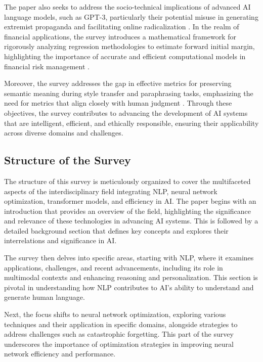 The paper also seeks to address the socio-technical implications of advanced AI language models, such as GPT-3, particularly their potential misuse in generating extremist propaganda and facilitating online radicalization \cite{mcguffie2020radicalizationrisksgpt3advanced}. In the realm of financial applications, the survey introduces a mathematical framework for rigorously analyzing regression methodologies to estimate forward initial margin, highlighting the importance of accurate and efficient computational models in financial risk management \cite{kun2022mathematicalfoundationsregressionmethods}.



Moreover, the survey addresses the gap in effective metrics for preserving semantic meaning during style transfer and paraphrasing tasks, emphasizing the need for metrics that align closely with human judgment \cite{yamshchikov2020styletransferparaphraselookingsensible}. Through these objectives, the survey contributes to advancing the development of AI systems that are intelligent, efficient, and ethically responsible, ensuring their applicability across diverse domains and challenges.



\subsection{Structure of the Survey} \label{subsec:Structure of the Survey}

The structure of this survey is meticulously organized to cover the multifaceted aspects of the interdisciplinary field integrating NLP, neural network optimization, transformer models, and efficiency in AI. The paper begins with an introduction that provides an overview of the field, highlighting the significance and relevance of these technologies in advancing AI systems. This is followed by a detailed background section that defines key concepts and explores their interrelations and significance in AI.



The survey then delves into specific areas, starting with NLP, where it examines applications, challenges, and recent advancements, including its role in multimodal contexts and enhancing reasoning and personalization. This section is pivotal in understanding how NLP contributes to AI's ability to understand and generate human language.



Next, the focus shifts to neural network optimization, exploring various techniques and their application in specific domains, alongside strategies to address challenges such as catastrophic forgetting. This part of the survey underscores the importance of optimization strategies in improving neural network efficiency and performance.



